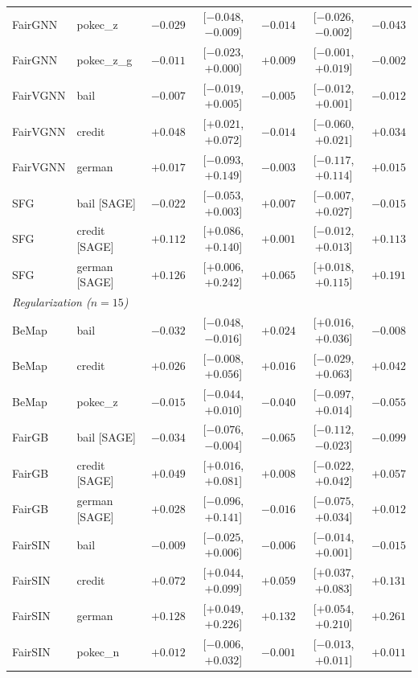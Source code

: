 \begin{table}[t]
\begin{tabular}{llrcrcr}
FairGNN & pokec\_z & $-0.029$ & [$-0.048$, $-0.009$] & $-0.014$ & [$-0.026$, $-0.002$] & $-0.043$ \\
FairGNN & pokec\_z\_g & $-0.011$ & [$-0.023$, $+0.000$] & $+0.009$ & [$-0.001$, $+0.019$] & $-0.002$ \\
\midrule
FairVGNN & bail & $-0.007$ & [$-0.019$, $+0.005$] & $-0.005$ & [$-0.012$, $+0.001$] & $-0.012$ \\
FairVGNN & credit & $+0.048$ & [$+0.021$, $+0.072$] & $-0.014$ & [$-0.060$, $+0.021$] & $+0.034$ \\
FairVGNN & german & $+0.017$ & [$-0.093$, $+0.149$] & $-0.003$ & [$-0.117$, $+0.114$] & $+0.015$ \\
\midrule
SFG & bail [SAGE] & $-0.022$ & [$-0.053$, $+0.003$] & $+0.007$ & [$-0.007$, $+0.027$] & $-0.015$ \\
SFG & credit [SAGE] & $+0.112$ & [$+0.086$, $+0.140$] & $+0.001$ & [$-0.012$, $+0.013$] & $+0.113$ \\
SFG & german [SAGE] & $+0.126$ & [$+0.006$, $+0.242$] & $+0.065$ & [$+0.018$, $+0.115$] & $+0.191$ \\
\midrule
\multicolumn{7}{l}{\textit{Regularization ($n=15$)}} \\
BeMap & bail & $-0.032$ & [$-0.048$, $-0.016$] & $\mathbf{+0.024}$ & [$+0.016$, $+0.036$] & $-0.008$ \\
BeMap & credit & $+0.026$ & [$-0.008$, $+0.056$] & $+0.016$ & [$-0.029$, $+0.063$] & $+0.042$ \\
BeMap & pokec\_z & $-0.015$ & [$-0.044$, $+0.010$] & $-0.040$ & [$-0.097$, $+0.014$] & $-0.055$ \\
\midrule
FairGB & bail [SAGE] & $-0.034$ & [$-0.076$, $-0.004$] & $\mathbf{-0.065}$ & [$-0.112$, $-0.023$] & $-0.099$ \\
FairGB & credit [SAGE] & $+0.049$ & [$+0.016$, $+0.081$] & $+0.008$ & [$-0.022$, $+0.042$] & $+0.057$ \\
FairGB & german [SAGE] & $+0.028$ & [$-0.096$, $+0.141$] & $-0.016$ & [$-0.075$, $+0.034$] & $+0.012$ \\
\midrule
FairSIN & bail & $-0.009$ & [$-0.025$, $+0.006$] & $-0.006$ & [$-0.014$, $+0.001$] & $-0.015$ \\
FairSIN & credit & $+0.072$ & [$+0.044$, $+0.099$] & $\mathbf{+0.059}$ & [$+0.037$, $+0.083$] & $+0.131$ \\
FairSIN & german & $+0.128$ & [$+0.049$, $+0.226$] & $\mathbf{+0.132}$ & [$+0.054$, $+0.210$] & $+0.261$ \\
FairSIN & pokec\_n & $+0.012$ & [$-0.006$, $+0.032$] & $-0.001$ & [$-0.013$, $+0.011$] & $+0.011$ \\

\end{tabular}
\end{table}

